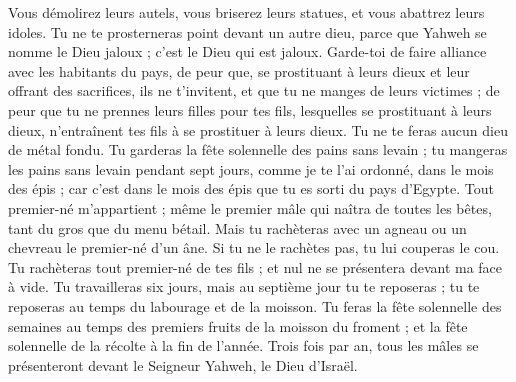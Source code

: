 \begin{multicols}{2}
Vous démolirez leurs autels, vous briserez leurs statues, et vous abattrez leurs idoles.
Tu ne te prosterneras point devant un autre dieu, parce que Yahweh se nomme le Dieu jaloux ; c'est le Dieu qui est jaloux.
Garde-toi de faire alliance avec les habitants du pays, de peur que, se prostituant à leurs dieux et leur offrant des sacrifices, ils ne t’invitent, et que tu ne manges de leurs victimes ;
de peur que tu ne prennes leurs filles pour tes fils, lesquelles se prostituant à leurs dieux, n’entraînent tes fils à se prostituer à leurs dieux.
Tu ne te feras aucun dieu de métal fondu.
Tu garderas la fête solennelle des pains sans levain ; tu mangeras les pains sans levain pendant sept jours, comme je te l'ai ordonné, dans le mois des épis ; car c’est dans le mois des épis que tu es sorti du pays d'Egypte.
Tout premier-né m’appartient ; même le premier mâle qui naîtra de toutes les bêtes, tant du gros que du menu bétail.
Mais tu rachèteras avec un agneau ou un chevreau le premier-né d'un âne. Si tu ne le rachètes pas, tu lui couperas le cou. Tu rachèteras tout premier-né de tes fils ; et nul ne se présentera devant ma face à vide.
Tu travailleras six jours, mais au septième jour tu te reposeras ; tu te reposeras au temps du labourage et de la moisson.
Tu feras la fête solennelle des semaines au temps des premiers fruits de la moisson du froment ; et la fête solennelle de la récolte à la fin de l'année.
Trois fois par an, tous les mâles se présenteront devant le Seigneur Yahweh, le Dieu d'Israël.

\end{multicols}
